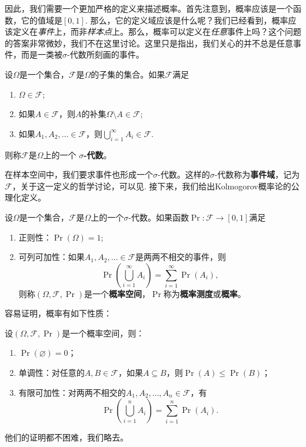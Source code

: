因此，我们需要一个更加严格的定义来描述概率。首先注意到，概率应该是一个函数，它的值域是$[0,1]$. 那么，它的定义域应该是什么呢？我们已经看到，概率应该定义在\emph{事件}上，而非\emph{样本点}上。那么，概率可以定义在\emph{任意}事件上吗？这个问题的答案非常微妙，我们不在这里讨论。这里只是指出，我们关心的并不总是任意事件，而是一类被$\sigma$-代数所刻画的事件。

\begin{definition}[$\sigma$-代数]
设$\Omega$是一个集合，$\mathscr{F}$是$\Omega$的子集的集合。如果$\mathscr{F}$满足
\begin{enumerate}
    \item $\Omega\in\mathscr{F}$;
    \item 如果$A\in\mathscr{F}$，则$A$的补集$\Omega\setminus A\in\mathscr{F}$;
    \item 如果$A_1,A_2,\ldots\in\mathscr{F}$，则$\bigcup_{i=1}^\infty A_i\in\mathscr{F}$.
\end{enumerate}
则称$\mathscr{F}$是$\Omega$上的一个 \textbf{$\sigma$-代数}。
\end{definition}

在样本空间中，我们要求事件也形成一个$\sigma$-代数。这样的$\sigma$-代数称为\textbf{事件域}，记为$\mathscr{F}$，关于这一定义的哲学讨论，可以见. 接下来，我们给出Kolmogorov概率论的公理化定义。

\begin{definition}
设$\Omega$是一个集合，$\mathscr{F}$是$\Omega$上的一个$\sigma$-代数。如果函数$\Pr:\mathscr{F}\to[0,1]$满足
\begin{enumerate}
    \item 正则性：$\Pr(\Omega)=1$;
    \item 可列可加性：如果$A_1,A_2,\dots\in\mathscr{F}$是两两不相交的事件，则
    \[
        \Pr\left(\bigcup_{i=1}^\infty A_i\right) = \sum_{i=1}^\infty \Pr(A_i),
    \]
    则称$(\Omega,\mathscr{F},\Pr)$是一个\textbf{概率空间}，$\Pr$称为\textbf{概率测度}或\textbf{概率}。
\end{enumerate}
\end{definition}
容易证明，概率有如下性质：
\begin{proposition}
设$(\Omega,\mathscr{F},\Pr)$是一个概率空间，则：
\begin{enumerate}
    \item $\Pr(\varnothing)=0$；
    \item 单调性：对任意的$A,B\in\mathscr{F}$，如果$A\subseteq B$，则$\Pr(A)\leq\Pr(B)$；
    \item 有限可加性：对两两不相交的$A_1,A_2,\dots,A_n\in\mathscr{F}$，有
    \[
        \Pr\left(\bigcup_{i=1}^n A_i\right) = \sum_{i=1}^n \Pr(A_i).
    \]
\end{enumerate}
\end{proposition}
他们的证明都不困难，我们略去。

